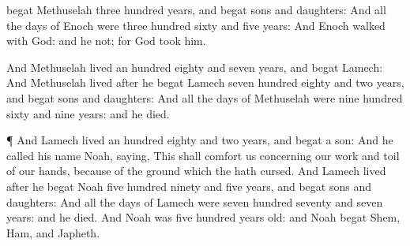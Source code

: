{begat
Methuselah
three
hundred
years, and
begat
sons and
daughters:
And all the
days of
Enoch were
three
hundred
sixty and
five
years:
And
Enoch
walked with
God: and he
{} not; for
God
took him.
\par }{\PP {}And
Methuselah
lived an
hundred
eighty and
seven
years, and
begat
Lamech:
And
Methuselah
lived
after he
begat
Lamech
seven
hundred
eighty and
two
years, and
begat
sons and
daughters:
And all the
days of
Methuselah were
nine
hundred
sixty and
nine
years: and he
died.
\par }{\PP {}¶ And
Lamech
lived an
hundred
eighty and
two
years, and
begat a
son:
And he
called his
name
Noah,
saying, This
{} shall
comfort us concerning our
work and
toil of our
hands,
because of the
ground which the
{} hath
cursed.
And
Lamech
lived
after he
begat
Noah
five
hundred
ninety and
five
years, and
begat
sons and
daughters:
And all the
days of
Lamech were
seven
hundred
seventy and
seven
years: and he
died.
And
Noah was
five
hundred
years
old: and
Noah
begat
Shem,
Ham, and
Japheth.

}
